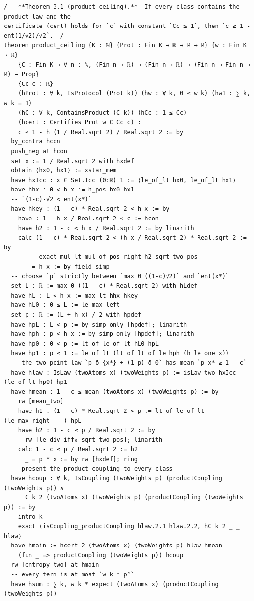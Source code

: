\documentclass[11pt,a4paper]{article}
\theoremstyle{definition}
\theoremstyle{remark}
\begin{document}
\begin{Verbatim}[fontsize=\scriptsize,formatcom=\leanmono,samepage=false]
/-- **Theorem 3.1 (product ceiling).**  If every class contains the product law and the
certificate (cert) holds for `c` with constant `Cc ≥ 1`, then `c ≤ 1 - ent(1/√2)/√2`. -/
theorem product_ceiling {K : ℕ} {Prot : Fin K → ℝ → ℝ → ℝ} {w : Fin K → ℝ}
    {C : Fin K → ∀ n : ℕ, (Fin n → ℝ) → (Fin n → ℝ) → (Fin n → Fin n → ℝ) → Prop}
    {Cc c : ℝ}
    (hProt : ∀ k, IsProtocol (Prot k)) (hw : ∀ k, 0 ≤ w k) (hw1 : ∑ k, w k = 1)
    (hC : ∀ k, ContainsProduct (C k)) (hCc : 1 ≤ Cc)
    (hcert : Certifies Prot w C Cc c) :
    c ≤ 1 - h (1 / Real.sqrt 2) / Real.sqrt 2 := by
  by_contra hcon
  push_neg at hcon
  set x := 1 / Real.sqrt 2 with hxdef
  obtain ⟨hx0, hx1⟩ := xstar_mem
  have hxIcc : x ∈ Set.Icc (0:ℝ) 1 := ⟨le_of_lt hx0, le_of_lt hx1⟩
  have hhx : 0 < h x := h_pos hx0 hx1
  -- `(1-c)·√2 < ent(x*)`
  have hkey : (1 - c) * Real.sqrt 2 < h x := by
    have : 1 - h x / Real.sqrt 2 < c := hcon
    have h2 : 1 - c < h x / Real.sqrt 2 := by linarith
    calc (1 - c) * Real.sqrt 2 < (h x / Real.sqrt 2) * Real.sqrt 2 := by
          exact mul_lt_mul_of_pos_right h2 sqrt_two_pos
      _ = h x := by field_simp
  -- choose `p` strictly between `max 0 ((1-c)√2)` and `ent(x*)`
  set L : ℝ := max 0 ((1 - c) * Real.sqrt 2) with hLdef
  have hL : L < h x := max_lt hhx hkey
  have hL0 : 0 ≤ L := le_max_left _ _
  set p : ℝ := (L + h x) / 2 with hpdef
  have hpL : L < p := by simp only [hpdef]; linarith
  have hph : p < h x := by simp only [hpdef]; linarith
  have hp0 : 0 < p := lt_of_le_of_lt hL0 hpL
  have hp1 : p ≤ 1 := le_of_lt (lt_of_lt_of_le hph (h_le_one x))
  -- the two-point law `p δ_{x*} + (1-p) δ_0` has mean `p x* ≥ 1 - c`
  have hlaw : IsLaw (twoAtoms x) (twoWeights p) := isLaw_two hxIcc (le_of_lt hp0) hp1
  have hmean : 1 - c ≤ mean (twoAtoms x) (twoWeights p) := by
    rw [mean_two]
    have h1 : (1 - c) * Real.sqrt 2 < p := lt_of_le_of_lt (le_max_right _ _) hpL
    have h2 : 1 - c ≤ p / Real.sqrt 2 := by
      rw [le_div_iff₀ sqrt_two_pos]; linarith
    calc 1 - c ≤ p / Real.sqrt 2 := h2
      _ = p * x := by rw [hxdef]; ring
  -- present the product coupling to every class
  have hcoup : ∀ k, IsCoupling (twoWeights p) (productCoupling (twoWeights p)) ∧
      C k 2 (twoAtoms x) (twoWeights p) (productCoupling (twoWeights p)) := by
    intro k
    exact ⟨isCoupling_productCoupling hlaw.2.1 hlaw.2.2, hC k 2 _ _ hlaw⟩
  have hmain := hcert 2 (twoAtoms x) (twoWeights p) hlaw hmean
    (fun _ => productCoupling (twoWeights p)) hcoup
  rw [entropy_two] at hmain
  -- every term is at most `w k * p²`
  have hsum : ∑ k, w k * expect (twoAtoms x) (productCoupling (twoWeights p))

\end{Verbatim}
\end{document}
